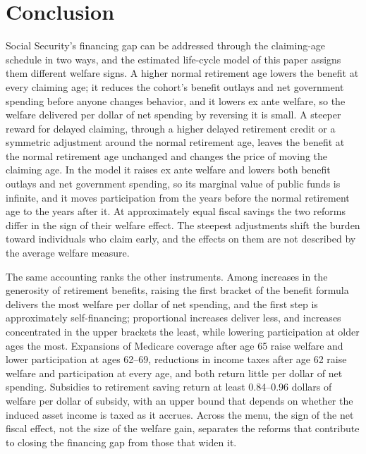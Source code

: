 \section{Conclusion}\label{sec:conclusion}

Social Security's financing gap can be addressed through the claiming-age schedule in two ways, and the estimated life-cycle model of this paper assigns them different welfare signs. A higher normal retirement age lowers the benefit at every claiming age; it reduces the cohort's benefit outlays and net government spending before anyone changes behavior, and it lowers ex ante welfare, so the welfare delivered per dollar of net spending by reversing it is small. A steeper reward for delayed claiming, through a higher delayed retirement credit or a symmetric adjustment around the normal retirement age, leaves the benefit at the normal retirement age unchanged and changes the price of moving the claiming age. In the model it raises ex ante welfare and lowers both benefit outlays and net government spending, so its marginal value of public funds is infinite, and it moves participation from the years before the normal retirement age to the years after it. At approximately equal fiscal savings the two reforms differ in the sign of their welfare effect. The steepest adjustments shift the burden toward individuals who claim early, and the effects on them are not described by the average welfare measure.

The same accounting ranks the other instruments. Among increases in the generosity of retirement benefits, raising the first bracket of the benefit formula delivers the most welfare per dollar of net spending, and the first step is approximately self-financing; proportional increases deliver less, and increases concentrated in the upper brackets the least, while lowering participation at older ages the most. Expansions of Medicare coverage after age 65 raise welfare and lower participation at ages 62--69, reductions in income taxes after age 62 raise welfare and participation at every age, and both return little per dollar of net spending. Subsidies to retirement saving return at least 0.84--0.96 dollars of welfare per dollar of subsidy, with an upper bound that depends on whether the induced asset income is taxed as it accrues. %
Across the menu, the sign of the net fiscal effect, not the size of the welfare gain, separates the reforms that contribute to closing the financing gap from those that widen it.

